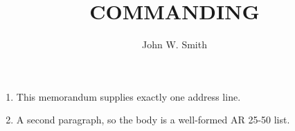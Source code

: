 \documentclass{../armymemo}
\author{John W. Smith}\rank{CPT}\branch{CY}
\title{COMMANDING}
\begin{document}
\begin{enumerate}
	\item This memorandum supplies exactly one address line.
	\item A second paragraph, so the body is a well-formed AR 25-50 list.
\end{enumerate}
\end{document}
